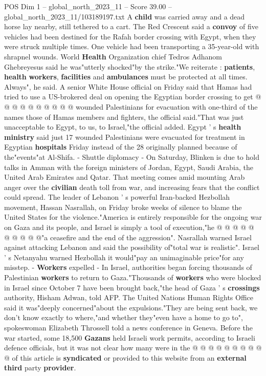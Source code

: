 \begin{textsample}{POS Dim 1 – global\_north\_2023\_11 – Score 39.00 – global\_north\_2023\_11/103189197.txt}
A \textbf{child} was carried away and a dead horse lay nearby, still tethered to a cart.
The Red Crescent said a \textbf{convoy} of five vehicles had been destined for the Rafah border crossing with Egypt, when they were struck multiple times.
One vehicle had been transporting a 35-year-old with shrapnel wounds.
World \textbf{Health} Organization chief Tedros Adhanom Ghebreyesus said he was"utterly shocked"by the strike."We reiterate : \textbf{patients}, \textbf{health} \textbf{workers}, \textbf{facilities} and \textbf{ambulances} must be protected at all times.
Always", he said.
A senior White House official on Friday said that Hamas had tried to use a US-brokered deal on opening the Egyptian border crossing to get @ @ @ @ @ @ @ @ @ @ wounded Palestinians for evacuation with one-third of the names those of Hamas members and fighters, the official said."That was just unacceptable to Egypt, to us, to Israel,"the official added.
Egypt ' s \textbf{health} \textbf{ministry} said just 17 wounded Palestinians were evacuated for treatment in Egyptian \textbf{hospitals} Friday instead of the 28 originally planned because of the"events"at Al-Shifa. - Shuttle diplomacy - On Saturday, Blinken is due to hold talks in Amman with the foreign ministers of Jordan, Egypt, Saudi Arabia, the United Arab Emirates and Qatar.
That meeting comes amid mounting Arab anger over the \textbf{civilian} death toll from war, and increasing fears that the conflict could spread.
The leader of Lebanon ' s powerful Iran-backed Hezbollah movement, Hassan Nasrallah, on Friday broke weeks of silence to blame the United States for the violence."America is entirely responsible for the ongoing war on Gaza and its people, and Israel is simply a tool of execution,"he @ @ @ @ @ @ @ @ @ @"a ceasefire and the end of the aggression".
Nasrallah warned Israel against attacking Lebanon and said the possibility of"total war is realistic".
Israel ' s Netanyahu warned Hezbollah it would"pay an unimaginable price"for any misstep. - \textbf{Workers} expelled - In Israel, authorities began forcing thousands of Palestinian \textbf{workers} to return to Gaza."Thousands of \textbf{workers} who were blocked in Israel since October 7 have been brought back,"the head of Gaza ' s \textbf{crossings} authority, Hisham Adwan, told AFP.
The United Nations Human Rights Office said it was"deeply concerned"about the expulsions."They are being sent back, we don't know exactly to where,"and whether they"even have a home to go to", spokeswoman Elizabeth Throssell told a news conference in Geneva.
Before the war started, some 18,500 \textbf{Gazans} held Israeli work permits, according to Israeli defence officials, but it was not clear how many were in the @ @ @ @ @ @ @ @ @ @ of this article is \textbf{syndicated} or provided to this website from an \textbf{external} \textbf{third} party \textbf{provider}.

\end{textsample}
